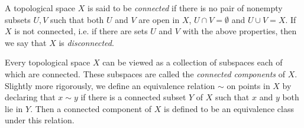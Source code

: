 \documentclass[12pt]{article}
\begin{document}
A topological space $X$ is said to be \emph{connected} if there is no pair of nonempty subsets $U,V$ such that both $U$ and $V$ are open in $X$, $U \cap V=\emptyset$ and $U \cup V=X$. If $X$ is not connected, i.e. if there are sets $U$ and $V$ with the above properties, then we say that $X$ is \emph{disconnected}.

Every topological space $X$ can be viewed as a collection of subspaces each of which are connected.  These subspaces are called the \emph{connected components} of $X$.  Slightly more rigorously, we define an equivalence relation $\sim$ on points in $X$ by declaring that $x\sim y$ if there is a connected subset $Y$ of $X$ such that $x$ and $y$ both lie in $Y$.  Then a connected component of $X$ is defined to be an equivalence class under this relation.
\end{document}
